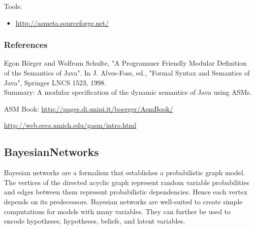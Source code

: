 Tools:
\begin{itemize}
    \item \url{http://asmeta.sourceforge.net/}
\end{itemize}


\subsubsection{References}

Egon B\"{o}rger and Wolfram Schulte, "A Programmer Friendly Modular Definition of the Semantics of Java". In J. Alves-Foss, ed., "Formal Syntax and Semantics of Java", Springer LNCS 1523, 1998. \\
Summary: A modular specification of the dynamic semantics of Java using ASMs.

ASM Book: \url{http://pages.di.unipi.it/boerger/AsmBook/}

\url{http://web.eecs.umich.edu/gasm/intro.html}

\cite{Borger2005}

\subsection{BayesianNetworks}
\label{subsecF:BayesianNetworks}



Bayesian networks are a formalism that establishes a probabilistic graph model.
The vertices of the directed acyclic graph represent random variable probabilities and edges between them represent probabilistic dependencies. Hence each vertex depends on its predecessors.
Bayesian networks are well-suited to create simple computations for models with many variables.
They can further be used to encode hypotheses, hypotheses, beliefs, and latent variables.


